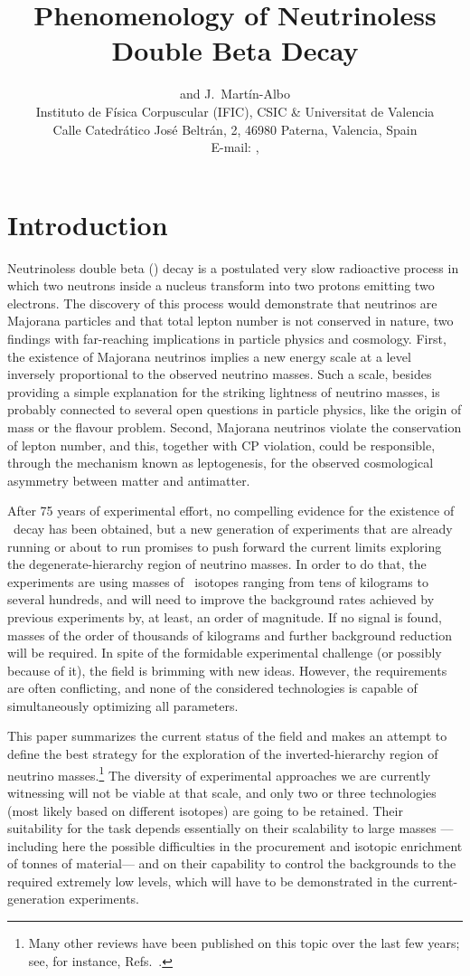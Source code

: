 \documentclass{PoS}
\title{Phenomenology of Neutrinoless Double Beta Decay}
\author{\speaker{J.J.\ G\'omez-Cadenas} and J.\ Mart\'in-Albo \\
Instituto de F\'isica Corpuscular (IFIC), CSIC \& Universitat de Valencia\\
Calle Catedr\'atico Jos\'e Beltr\'an, 2, 46980 Paterna, Valencia, Spain\\
E-mail: \email{gomez@mail.cern.ch}, \email{jmalbos@ific.uv.es}}
\begin{document}
\section{Introduction}
Neutrinoless double beta (\bbonu) decay is a postulated very slow radioactive process in which two neutrons inside a nucleus transform into two protons emitting two electrons. The discovery of this process would demonstrate that neutrinos are Majorana particles and that total lepton number is not conserved in nature, two findings with far-reaching implications in particle physics and cosmology. First, the existence of Majorana neutrinos implies a new energy scale at a level inversely proportional to the observed neutrino masses. Such a scale, besides providing a simple explanation for the striking lightness of neutrino masses, is probably connected to several open questions in particle physics, like the origin of mass or the flavour problem. Second, Majorana neutrinos violate the conservation of lepton number, and this, together with CP violation, could be responsible, through the mechanism known as leptogenesis, for the observed cosmological asymmetry between matter and antimatter. 

After 75 years of experimental effort, no compelling evidence for the existence of \bbonu\ decay has been obtained, but a new generation of experiments that are already running or about to run promises to push forward the current limits exploring the degenerate-hierarchy region of neutrino masses. In order to do that, the experiments are using masses of \bbonu\ isotopes ranging from tens of kilograms to several hundreds, and will need to improve the background rates achieved by previous experiments by, at least, an order of magnitude. If no signal is found, masses of the order of thousands of kilograms and further background reduction will be required. In spite of the formidable experimental challenge (or possibly because of it), the field is brimming with new ideas. However, the requirements are often conflicting, and none of the considered technologies is capable of simultaneously optimizing all parameters. 

This paper summarizes the current status of the field and makes an attempt to define the best strategy for the exploration of the inverted-hierarchy region of neutrino masses.\footnote{Many other reviews have been published on this topic over the last few years; see, for instance, Refs.~\cite{GomezCadenas:2011it, Elliott:2012sp, Giuliani:2012zu, Cremonesi:2013vla, Bilenky:2014uka}.} The diversity of experimental approaches we are currently witnessing will not be viable at that scale, and only two or three technologies (most likely based on different isotopes) are going to be retained. Their suitability for the task depends essentially on their scalability to large masses ---\thinspace including here the possible difficulties in the procurement and isotopic enrichment of tonnes of material\thinspace--- and on their capability to control the backgrounds to the required extremely low levels, which will have to be demonstrated in the current-generation experiments.
\end{document}
